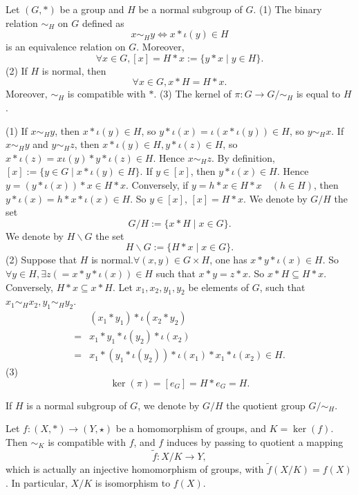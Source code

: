 \documentclass{book}
\numberwithin{equation}{section}
\begin{document}
\begin{propositionenv}
    Let $(G,*)$ be a group and $H$ be a normal subgroup of $G$.
    \newline
    (1) The binary relation $\sim_H$ on $G$ defined as 
    $$x\sim_H y\Leftrightarrow x*\iota(y)\in H$$
    is an equivalence relation on $G$. Moreover, 
    $$\forall x\in G, [x]=H*x:=\{y*x\mid y\in H\}.$$
    (2) If $H$ is normal, then
    $$\forall x\in G,x*H=H*x.$$
    Moreover, $\sim_H$ is compatible with $*$.
    \newline
    (3) The kernel of $\pi :G\rightarrow G/\sim_H$ is equal to $H$.
\end{propositionenv}
\begin{proofenv}
    \quad\newline
    (1) If $x\sim_H y$, then $x*\iota(y)\in H$, so $y*\iota(x)=\iota(x*\iota(y))\in H$, so $y\sim_H x$. If $x\sim_H y$ and $y\sim_H z$, then $x*\iota(y)\in H, y*\iota(z)\in H$, so $x*\iota(z)=x\iota(y)*y*\iota(z)\in H$. Hence $x\sim_H z$. By definition, $[x]:=\{y\in G\mid  x*\iota(y)\in H\}$. If $y\in [x]$, then $y*\iota(x)\in H$. Hence $y=(y*\iota(x))*x\in H*x$. Conversely, if $y=h*x\in H*x \quad (h\in H)$, then $y*\iota(x)=h*x*\iota(x)\in H$. So $y\in [x]$, $[x]=H*x$.
    \newline
    We denote by $G/H $ the set 
    $$G/H:=\{x*H\mid x\in G\}.$$ 
    We denote by $H\backslash G$ the set 
    $$H\backslash G:=\{H*x\mid x\in G\}.$$
    (2) Suppose that $H$ is normal.$\forall (x,y)\in G\times H$, one has $x*y*\iota(x)\in H$. So $\forall y\in H,\exists z(=x*y*\iota(x))\in H$ such that $x*y=z*x$. So $x*H\subseteq H*x$. Conversely, $H*x\subseteq x*H$. Let $x_1,x_2,y_1,y_2$ be elements of $G$, such that $x_1\sim_H x_2,y_1\sim_H y_2$.
    \begin{align*}
&(x_1*y_1)*\iota (x_2*y_2)\\
=&x_1*y_1*\iota (y_2)*\iota (x_2)\\
=&x_1*(y_1*\iota (y_2))*\iota (x_1)*x_1*\iota (x_2)\in H.
\end{align*}
    (3)$$\ker(\pi)=[e_G]=H*e_G=H.$$
\end{proofenv}
\begin{notationenv}
    If $H$ is a normal subgroup of $G$, we denote by $G/H$ the quotient group $G/\sim_H$.
\end{notationenv}
\begin{theoremenv}
    Let $f:(X,*)\rightarrow (Y,\star)$ be a homomorphism of groups, and $K=\ker(f)$. Then $\sim_K$ is compatible with $f$, and $f$ induces by passing to quotient a mapping
    $$\tilde{f}:X/K\longrightarrow Y,$$
    which is actually an injective homomorphism of groups, with $\tilde{f}(X/K)=f(X)$. In particular, $X/K$ is isomorphism to $f(X)$.
        \begin{center}
\end{center}
\end{theoremenv}
\end{document}
